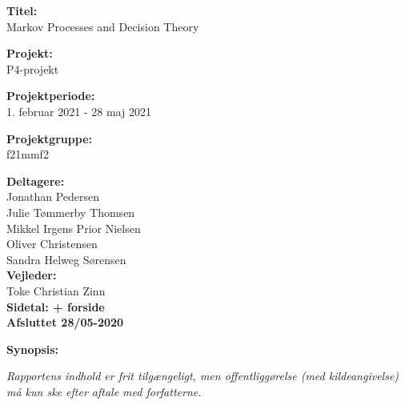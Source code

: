 \begin{minipage}[t]{0.48\textwidth}
\textbf{Titel:} \\[5pt]\hspace{2ex}
{Markov Processes and Decision Theory}
\bigskip

\textbf{Projekt:} \\[5pt]\hspace{2ex}
P4-projekt
\bigskip

\textbf{Projektperiode:} \\[5pt]\hspace{2ex}
1. februar 2021 - 28 maj 2021
\bigskip

\textbf{Projektgruppe:} \\[5pt]\hspace{2ex}
f21mmf2
\bigskip

\textbf{Deltagere:} \\[5pt]%
Jonathan Pedersen\\%
Julie Tømmerby Thomsen\\%
Mikkel Irgens Prior Nielsen \\%
Oliver Christensen\\%
Sandra Helweg Sørensen\\

\textbf{Vejleder:} \\[5pt]%
Toke Christian Zinn \\

\textbf{Sidetal: \pageref{LastPage} + forside} \\ 
\textbf{Afsluttet 28/05-2020}

\end{minipage}
\hfill
\begin{minipage}[t]{0.5\textwidth}
\textbf{Synopsis:} \\[5pt]
\end{minipage}
\hspace*{2ex}

\vfill

{\footnotesize \textit{Rapportens indhold er frit tilgængeligt, men offentliggørelse (med kildeangivelse) må kun ske efter aftale med forfatterne.}}

\pagebreak
\phantom{a}
\thispagestyle{empty}